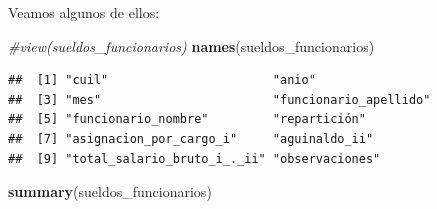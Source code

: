\documentclass[]{book}
\newenvironment{Shaded}{\begin{snugshade}}{\end{snugshade}}
\newcommand{\CommentTok}[1]{\textcolor[rgb]{0.56,0.35,0.01}{\textit{#1}}}
\newcommand{\KeywordTok}[1]{\textcolor[rgb]{0.13,0.29,0.53}{\textbf{#1}}}
\newcommand{\NormalTok}[1]{#1}
\begin{document}
Veamos algunos de ellos:

\begin{Shaded}
\begin{Highlighting}[]
\CommentTok{#view(sueldos_funcionarios)}
\KeywordTok{names}\NormalTok{(sueldos_funcionarios)}
\end{Highlighting}
\end{Shaded}

\begin{verbatim}
##  [1] "cuil"                       "anio"                      
##  [3] "mes"                        "funcionario_apellido"      
##  [5] "funcionario_nombre"         "repartición"               
##  [7] "asignacion_por_cargo_i"     "aguinaldo_ii"              
##  [9] "total_salario_bruto_i_._ii" "observaciones"
\end{verbatim}

\begin{Shaded}
\begin{Highlighting}[]
\KeywordTok{summary}\NormalTok{(sueldos_funcionarios)}
\end{Highlighting}
\end{Shaded}
\end{document}
